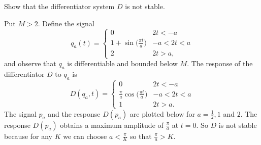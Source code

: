 \begin{excersizelist}
\item \label{excer:diffnotstable} Show that the differentiator system $D$ is not  stable.
\begin{solution}
Put $M > 2$.  Define the signal
\[
q_a(t) = \begin{cases}
0 & 2t < -a \\
1 + \sin\big(\tfrac{\pi t}{a}\big) & -a < 2t < a \\
2 & 2t > a,
\end{cases}
\]
and observe that $q_a$ is differentiable and bounded below $M$.  The response of the differentiator $D$ to $q_a$ is
\[
D(q_a,t) = \begin{cases}
0 & 2t < -a \\
\tfrac{\pi}{a} \cos\big(\tfrac{\pi t}{a}\big) & -a < 2t < a \\
1 & 2t > a.
\end{cases}
\]
The signal $p_a$ and the response $D(p_a)$ are plotted below for $a = \tfrac{1}{2},1$ and $2$.  The response $D(p_a)$ obtains a maximum amplitude of $\tfrac{\pi}{a}$ at $t=0$.  So $D$ is not stable because for any $K$ we can choose $a < \tfrac{\pi}{K}$ so that $\tfrac{\pi}{a} > K$.

\newcommand{\sinpulse}[1]{
\draw[color=black,thick] (-1.5,0) -- (-#1/2,0) node {};
\draw[smooth,color=black,thick,domain=-#1/2.0:#1/2.0] plot function{1 + sin(3.14159265359*x/#1)};
\draw[color=black,thick] (#1/2,2) -- (1.5,2)  node {};
}
\newcommand{\responsesinpulse}[1]{
\draw[color=black,thick] (-1.5,0) -- (-#1/2,0) node {};
\draw[smooth,color=black,thick,domain=-#1/2.0:#1/2.0] plot function{3.14159265359/#1*cos(3.14159265359*x/#1)};
\draw[color=black,thick] (#1/2,0) -- (1.5,0)  node {};
}
\newcommand{\sinpulseresponse}[1]{}
\begin{center}
\;\;
\end{center}
\end{solution}


\end{excersizelist}
